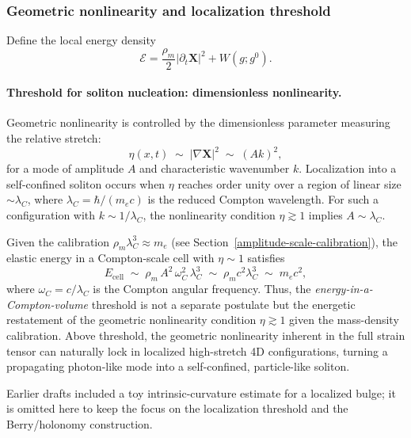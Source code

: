 \subsubsection{Geometric nonlinearity and localization threshold}\label{subsec:geom-threshold}

Define the local energy density
\begin{equation}
\mathcal{E}=\frac{\rho_m}{2}|\partial_t\mathbf{X}|^2
+W(g;g^0).
\label{eq:energy-density}
\end{equation}

\paragraph{Threshold for soliton nucleation: dimensionless nonlinearity.}
Geometric nonlinearity is controlled by the dimensionless parameter measuring the relative stretch:
\begin{equation}
\eta(x,t) \;\sim\; |\nabla \mathbf{X}|^2 \;\sim\; (A k)^2,
\label{eq:eta-nonlinearity}
\end{equation}
for a mode of amplitude $A$ and characteristic wavenumber $k$. Localization into a self-confined soliton occurs when $\eta$ reaches order unity over a region of linear size $\sim\lambda_C$, where $\lambda_C = \hbar/(m_e c)$ is the reduced Compton wavelength. For such a configuration with $k \sim 1/\lambda_C$, the nonlinearity condition $\eta \gtrsim 1$ implies $A \sim \lambda_C$.

Given the calibration $\rho_m \lambda_C^3 \approx m_e$ (see Section~\ref{amplitude-scale-calibration}), the elastic energy in a Compton-scale cell with $\eta \sim 1$ satisfies
\begin{equation}
E_{\text{cell}} \;\sim\; \rho_m\,A^2\,\omega_C^2\,\lambda_C^3
\;\sim\; \rho_m c^2 \lambda_C^3
\;\sim\; m_e c^2,
\label{eq:threshold-criterion}
\end{equation}
where $\omega_C = c/\lambda_C$ is the Compton angular frequency. Thus, the \emph{energy-in-a-Compton-volume} threshold is not a separate postulate but the energetic restatement of the geometric nonlinearity condition $\eta \gtrsim 1$ given the mass-density calibration. Above threshold, the geometric nonlinearity inherent in the full strain tensor can naturally lock in localized high-stretch 4D configurations, turning a propagating photon-like mode into a self-confined, particle-like soliton.

Earlier drafts included a toy intrinsic-curvature estimate for a localized bulge; it is omitted here to keep the focus on the localization threshold and the Berry/holonomy construction.

